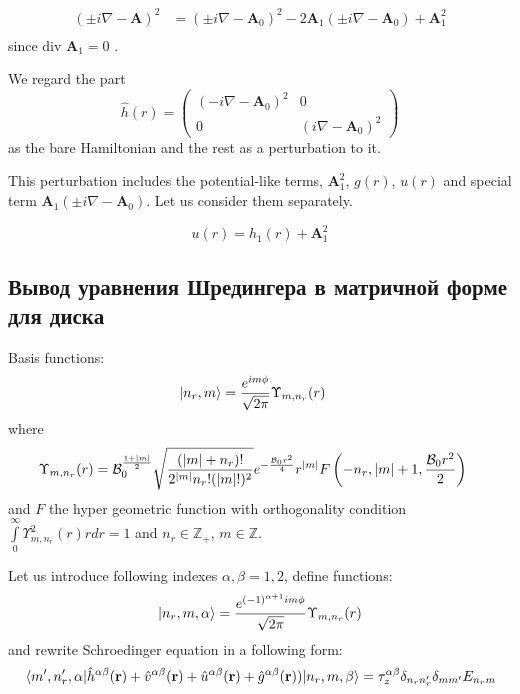 \documentclass[a4paper,article,14pt]{extarticle}
\begin{document}
\begin{equation}
\begin{aligned}
(\pm i \nabla - \mathbf{A} ) ^ 2 & = (\pm i \nabla - \mathbf{A}_0 ) ^ 2 - 
2 \mathbf{A}_1  (\pm i \nabla - \mathbf{A}_0 )+ \mathbf{A}_1^2   \\
\end{aligned}
\label{}
\end{equation}
since $ \mbox{div } \mathbf{A}_1=0$ . 

We regard the part $$
\hat h (r) =\begin{pmatrix} ( -i \nabla - \mathbf{A}_0 ) ^ 2 & 0 \\ 0 & ( i \nabla - \mathbf{A}_0 ) ^ 2 \end{pmatrix}
$$
as the bare Hamiltonian and the rest as a perturbation to it. 

This perturbation includes the potential-like terms, $\mathbf{A}_1^2$, $g(r)$, $u(r)$ and special term 
$\mathbf{A}_1  (\pm i \nabla - \mathbf{A}_0 )$. Let us consider them separately. 

$$u(r) = h_1 (r) + \mathbf{A}_1^2$$

\subsection{Вывод уравнения Шредингера в матричной форме для диска}
\noindent Basis functions:
\begin{equation}
\begin{aligned}
\ket{n_r, m} &= \frac{e^{i m \phi}} {\sqrt{2 \pi}} \Upsilon_{m,n_r} (r)
\end{aligned}
\end{equation}
\noindent where  
\begin{equation}
\begin{aligned}
\Upsilon_{m, n_r} (r) & = {\cal B}_{0}^{\frac{1+|m|}{2}} \sqrt{\frac{(|m| + n_r)!}{2^{|m|}n_r!(|m|!)^2}} e^{-\frac{{\cal B}_{0} r^2}{4}} r^{|m|} F\left(-n_r,|m| + 1,\frac{{\cal B}_{0} r^2 }{2} \right) 
\end{aligned}
\end{equation}
\noindent and $F$  the  hyper geometric function with orthogonality condition $ \int\limits_0^\infty \Upsilon_{m, n_r}^2 (r) r dr = 1$ and $n_r \in \mathbb{Z}_+$, $m \in \mathbb{Z}$.

Let us introduce following indexes $\alpha,\beta = 1, 2$, define functions:
$$
\ket{n_r, m, \alpha} = \frac{e^{(-1)^{\alpha+1}  i m \phi}} {\sqrt{2 \pi}} \Upsilon_{m,n_r} (r)
$$
and rewrite Schroedinger equation in a following form:
\begin{equation}
\mel{m', n'_r, \alpha}{\hat h^{\alpha \beta}(\mathbf{r}) + \hat v^{\alpha \beta}(\mathbf{r}) + \hat u^{\alpha \beta}(\mathbf{r}) + \hat g^{\alpha \beta} (\mathbf{r})) }{n_r,m, \beta} = {\tau_z^{\alpha \beta} \delta_{n_r n'_r} \delta_{m m'} E_{n_r m} }
\end{equation}
\end{document}
